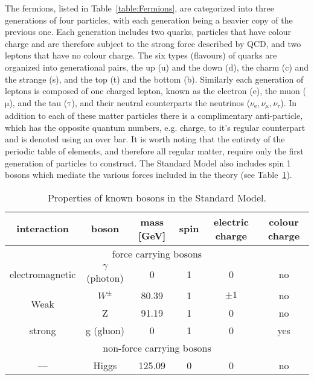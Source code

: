 The fermions, listed in Table~\ref{table:Fermions}, are categorized into three generations of four particles, with each generation being a heavier copy of the previous one.  
Each generation includes two quarks, particles that have colour charge and are therefore subject to the strong force described by \gls{QCD}, and two leptons that have no colour charge.  
The six types (flavours) of quarks are organized into generational pairs, the up (u) and the down (d), the charm (c) and the strange (s), and the top (t) and the bottom (b).  
Similarly each generation of leptons is composed of one charged lepton, known as the electron (e), the muon ($\mathrm{\mu}$), and the tau ($\mathrm{\tau}$), and their neutral counterparts the neutrinos ($\nu_{\mathrm{e}}, \nu_{\mu}, \nu_{\tau}$).  
In addition to each of these matter particles there is a complimentary anti-particle, which has the opposite quantum numbers, e.g. charge, to it's regular counterpart and is denoted using an over bar.  
It is worth noting that the entirety of the periodic table of elements, and therefore all regular matter, require only the first generation of particles to construct.  
The Standard Model also includes spin 1 bosons which mediate the various forces included in the theory (see Table~\ref{table:Bosons}). 

\begin{table}
  \centering
  \begin{tabular}{ |c|c|c|c|c|c|}
  \hline
  interaction     & boson             & mass [GeV] & spin & electric charge &  colour charge \\ \hline
  \multicolumn{6}{|c|}{force carrying bosons} \\ \hline
  electromagnetic & $\gamma$ (photon) & 0          & 1 & 0 & no \\ \hline
  \multirow{2}{*}{Weak} & $W^{\pm}$ & 80.39 & 1 & $\pm1$ & no  \\ 
                        & Z & 91.19 & 1 & 0 & no \\ \hline
  strong & g (gluon) & 0 & 1 & 0 & yes \\ \hline 
  \multicolumn{6}{|c|}{non-force carrying bosons} \\ \hline
  --- & Higgs & 125.09 & 0 & 0 & no \\ \hline
  \end{tabular}
  \caption[Properties of known bosons in the Standard Model.]
        {\small Properties of known bosons in the Standard Model.}
\label{table:Bosons}
\end{table}



